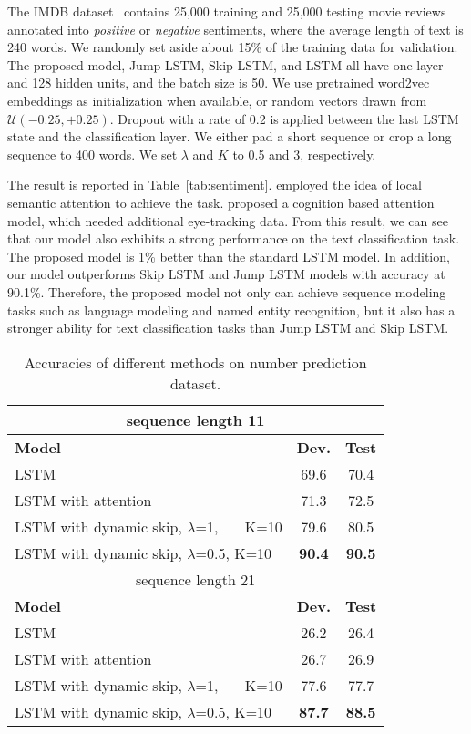 \documentclass[letterpaper]{article} \usepackage{aaai19}  \usepackage{times}  \usepackage{helvet}  \usepackage{courier}  \usepackage{url}  \usepackage{graphicx}  \usepackage{amsmath}
\begin{document}
The IMDB dataset~\cite{maas2011learning} contains 25,000 training and 25,000 testing movie reviews annotated into \textit{positive} or \textit{negative} sentiments, where the average length of text is 240 words. We randomly set aside about 15\% of the training data for validation. The proposed model, Jump LSTM, Skip LSTM, and LSTM all have one layer and 128 hidden units, and the batch size is 50. We use pretrained word2vec embeddings as initialization when available, or random vectors drawn from $\mathcal{U}(-0.25,+0.25)$. Dropout with a rate of 0.2 is applied between the last LSTM state and the classification layer. We either pad a short sequence or crop a long sequence to 400 words. We set $\lambda$ and $K$ to 0.5 and 3, respectively.

The result is reported in Table~\ref{tab:sentiment}. \cite{chen2016neural} employed the idea of local semantic attention to achieve the task. \cite{long2017cognition} proposed a cognition based attention model, which needed additional eye-tracking data. From this result, we can see that our model also exhibits a strong performance on the text classification task. The proposed model is 1\% better than the standard LSTM model. In addition, our model outperforms Skip LSTM and Jump LSTM models with accuracy at 90.1\%. Therefore, the proposed model not only can achieve sequence modeling tasks such as language modeling and named entity recognition, but it also has a stronger ability for text classification tasks than Jump LSTM and Skip LSTM.




\begin{table}[t]
\centering
\begin{tabular}{|l|c|c|}
\hline
  \multicolumn{3}{|c|}{sequence length 11}\\
  \hline
  \textbf{Model}  & \textbf{Dev.} & \textbf{Test}\\
  \hline
  LSTM & 69.6 & 70.4\\
  LSTM with attention & 71.3 & 72.5\\
  LSTM with dynamic skip, $\lambda$=1, \ \ \ K=10 & 79.6 & 80.5\\
  LSTM with dynamic skip, $\lambda$=0.5, K=10 & \textbf{90.4} & \textbf{90.5}\\
  \hline
  \multicolumn{3}{|c|}{sequence length 21}\\
  \hline
  \textbf{Model}  & \textbf{Dev.} & \textbf{Test}\\
  \hline
  LSTM & 26.2 & 26.4\\
  LSTM with attention & 26.7 & 26.9\\
  LSTM with dynamic skip, $\lambda$=1, \ \ \ K=10 & 77.6 & 77.7\\
  LSTM with dynamic skip, $\lambda$=0.5, K=10 & \textbf{87.7} & \textbf{88.5}\\
  \hline
\end{tabular}
\caption{Accuracies of different methods on number prediction dataset.}
  \label{tab:number}
\end{table}
\end{document}
